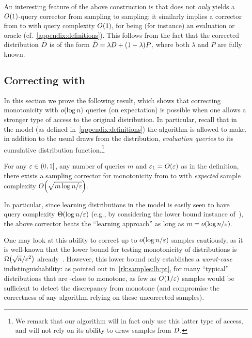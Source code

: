\begin{remark}\label{rk:oblivious:stronger:queries}
An interesting feature of the above construction is that does not
\emph{only} yields a $\bigO{1}$-query corrector from {sampling to sampling}: it
similarly implies a corrector from \ORACLE to \ORACLE with query complexity
$\bigO{1}$, for \ORACLE being (for instance) an evaluation or \Cdfsamp oracle (cf.~\autoref{appendix:definitions}). 
This follows from the fact that the corrected distribution $\tilde{D}$ is of the form $\tilde{D} = \lambda D+(1-\lambda)P$, where
both $\lambda$ and $P$ are fully known.
\end{remark}

\subsection{Correcting with }\label{sec:monotonicity:cdf}
\newcommand{\supb}{S}

In this section we prove the following result, which shows that correcting monotonicity with $\littleO{\log n}$ queries (on expectation) is possible when one allows a stronger type of access to the original distribution. In particular, recall that in the \Cdfsamp model (as defined in~\autoref{appendix:definitions}) the algorithm is allowed to make, in addition to the usual draws from the distribution, \emph{evaluation queries} to its cumulative distribution function.\footnote{We remark that our algorithm will in fact only use this latter type of access, and will not rely on its ability to draw samples from $D$.}

\begin{theorem}\label{theo:samp:corrector:monotonicity:cdf}
For any $\varepsilon \in (0,1]$, any number of queries $m$ and $\eps_1 = \bigO{\eps}$ as in the definition, there exists a sampling corrector for monotonicity from \Cdfsamp to \SAMP with \emph{expected} sample complexity $\bigO{\sqrt{m\log n/\eps}}$.
\end{theorem}
\noindent In particular, since learning distributions in the \Cdfsamp model is easily seen to have query complexity $\bigTheta{\log n/\eps}$ (e.g., by considering the lower bound instance of~\cite{Birge:87}), the above corrector beats the ``learning approach'' as long as $m=\littleO{\log n/\eps}$.

{
\begin{remark}
One may look at this ability to correct up to $\littleO{\log n/\eps}$ samples cautiously, as it is well-known that the lower bound for testing monotonicity of distributions is $\bigOmega{\sqrt{n}/\eps^2}$ already~\cite{BKR:04}. However, this lower bound only establishes a \emph{worst-case} indistinguishability: as pointed out in~\autoref{rk:samples:lb:pt}, for many ``typical'' distributions that are \eps-close to monotone, as few as $O(1/\varepsilon)$ samples would be sufficient to detect the discrepancy from monotone (and compromise the correctness of any algorithm relying on these uncorrected samples). 
\end{remark}
}


